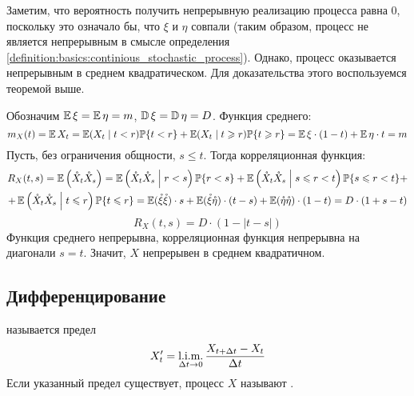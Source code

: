 \begin{solution}
    Заметим, что вероятность получить непрерывную реализацию процесса равна $ 0 $,
    поскольку это означало бы, что $ \xi $ и $ \eta $ совпали
    (таким образом, процесс не является непрерывным в смысле определения \ref{definition:basics:continious_stochastic_process}).
    Однако, процесс оказывается непрерывным в среднем квадратическом.
    Для доказательства этого воспользуемся теоремой выше.

    Обозначим $ \operatorname{\mathbb{E}} \xi = \operatorname{\mathbb{E}} \eta = m $, $ \operatorname{\mathbb{D}} \xi = \operatorname{\mathbb{D}} \eta = D $.
    Функция среднего:
    \[
        m_X(t) = \operatorname{\mathbb{E}} X_t = \operatorname{\mathbb{E}} (X_t \mid t < r) \mathbb{P} \{t < r\} + \operatorname{\mathbb{E}} (X_t \mid t \geqslant r) \mathbb{P} \{t \geqslant r\} = \operatorname{\mathbb{E}} \xi \cdot (1 - t) + \operatorname{\mathbb{E}} \eta \cdot t = m
    \]
    Пусть, без ограничения общности, $ s \leqslant t $.
    Тогда корреляционная функция:
    \begin{multline*}
        R_X(t,s) = \operatorname{\mathbb{E}} \left( \mathring{X}_t \mathring{X}_s \right) =
        \operatorname{\mathbb{E}} \left( \mathring{X}_t \mathring{X}_s \;\middle|\; r < s \right) \mathbb{P} \{r < s\} +
        \operatorname{\mathbb{E}} \left( \mathring{X}_t \mathring{X}_s \;\middle|\; s \leqslant r < t \right) \mathbb{P} \{s \leqslant r < t\} + \\
        + \operatorname{\mathbb{E}} \left( \mathring{X}_t \mathring{X}_s \;\middle|\; t \leqslant r \right) \mathbb{P} \{t \leqslant r\} =
        \operatorname{\mathbb{E}} (\mathring{\xi} \mathring{\xi}) \cdot s +
        \operatorname{\mathbb{E}} (\mathring{\xi} \mathring{\eta}) \cdot (t - s) +
        \operatorname{\mathbb{E}} (\mathring{\eta} \mathring{\eta}) \cdot (1 - t) =
        D \cdot (1 + s - t)
    \end{multline*}
    \[
        R_X(t, s) = D \cdot (1 - |t - s|)
    \]
    Функция среднего непрерывна, корреляционная функция непрерывна на диагонали $ s = t $.
    Значит, $ X $ непрерывен в среднем квадратичном.
\end{solution}



\subsection{Дифференцирование} \label{subsection:calculus:derivative}

\begin{definition}
    \label{definition:calculus:derivative}
     называется предел
    \[
        X_t' = \operatorname*{\textnormal{l.i.m.}}_{\Delta t \to 0} \frac{X_{t + \Delta t} - X_t}{\Delta t}
    \]
    Если указанный предел существует, процесс $ X $ называют .
\end{definition}

